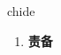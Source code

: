 
\begin{frame}
{\huge chide}
\begin{center}
\begin{enumerate}\Large
  \item \textbf{责备}
\end{enumerate}
\end{center}
\end{frame}
